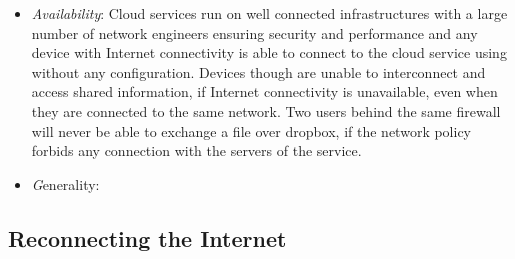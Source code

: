 \begin{itemize}
\item {\it Availability}: Cloud services run on well connected infrastructures
      with a large number of network engineers ensuring security and
      performance and any device with Internet connectivity is able to connect to
      the cloud service using without any configuration.  Devices though
      are unable to interconnect and access shared information, if Internet
      connectivity is unavailable, even when they are connected to the same
      network.  Two users behind the same firewall will never be able to
      exchange a file over dropbox, if the network policy forbids any connection
      with the servers of the service. 
\item {\emph Generality}: 

\end{itemize}

\subsection{Reconnecting the Internet}\label{sec:signpost-design}

